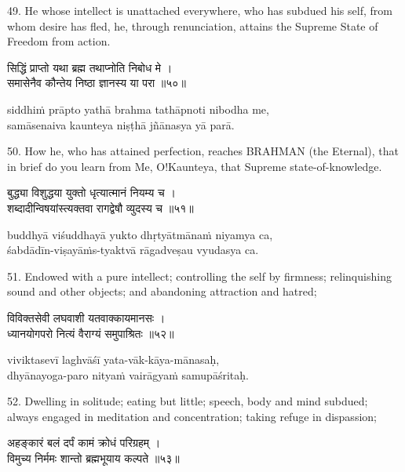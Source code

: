 49. He whose intellect is unattached everywhere, who has subdued his self, from
whom desire has fled, he, through renunciation, attains the Supreme State of
Freedom from action.

\begin{gitaverse}
सिद्धिं प्राप्तो यथा ब्रह्म तथाप्नोति निबोध मे । \\
समासेनैव कौन्तेय निष्ठा ज्ञानस्य या परा ॥५०॥
\end{gitaverse}

\begin{transliteration}
siddhiṁ prāpto yathā brahma tathāpnoti nibodha me, \\
samāsenaiva kaunteya niṣṭhā jñānasya yā parā.
\end{transliteration}

50. How he, who has attained perfection, reaches BRAHMAN (the Eternal), that in
brief do you learn from Me, O!\@ Kaunteya, that Supreme state-of-knowledge.

\begin{gitaverse}
बुद्ध्या विशुद्धया युक्तो धृत्यात्मानं नियम्य च । \\
शब्दादीन्विषयांस्त्यक्तवा रागद्वेषौ व्युदस्य च ॥५१॥
\end{gitaverse}

\begin{transliteration}
buddhyā viśuddhayā yukto dhṛtyātmānaṁ niyamya ca, \\
śabdādīn-viṣayāṁs-tyaktvā rāgadveṣau vyudasya ca.
\end{transliteration}

51. Endowed with a pure intellect; controlling the self by firmness;
relinquishing sound and other objects; and abandoning attraction and hatred;

\begin{gitaverse}
विविक्तसेवी लघवाशी यतवाक्कायमानसः । \\
ध्यानयोगपरो नित्यं वैराग्यं समुपाश्रितः ॥५२॥
\end{gitaverse}

\begin{transliteration}
viviktasevī laghvāśī yata-vāk-kāya-mānasaḥ, \\
dhyānayoga-paro nityaṁ vairāgyaṁ samupāśritaḥ.
\end{transliteration}

52. Dwelling in solitude; eating but little; speech, body and mind subdued;
always engaged in meditation and concentration; taking refuge in dispassion;

\begin{gitaverse}
अहङ्कारं बलं दर्पं कामं क्रोधं परिग्रहम् । \\
विमुच्य निर्ममः शान्तो ब्रह्मभूयाय कल्पते ॥५३॥
\end{gitaverse}

